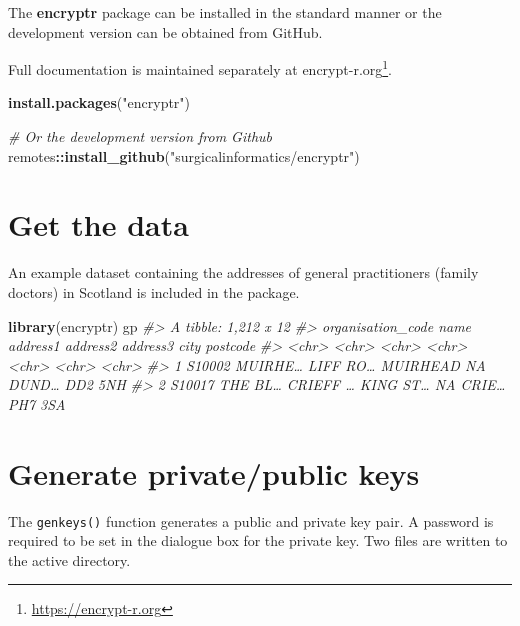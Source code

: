 \documentclass[
  12pt,
  krantz2]{krantz}
\makeatletter
\newenvironment{Shaded}{\begin{snugshade}}{\end{snugshade}}
\newcommand{\CommentTok}[1]{\textcolor[rgb]{0.56,0.35,0.01}{\textit{#1}}}
\newcommand{\KeywordTok}[1]{\textcolor[rgb]{0.13,0.29,0.53}{\textbf{#1}}}
\newcommand{\NormalTok}[1]{#1}
\newcommand{\OperatorTok}[1]{\textcolor[rgb]{0.81,0.36,0.00}{\textbf{#1}}}
\newcommand{\StringTok}[1]{\textcolor[rgb]{0.31,0.60,0.02}{#1}}
\renewcommand{\href}[2]{#2\footnote{\url{#1}}}
\newenvironment{kframe}{%
\medskip{}
\setlength{\fboxsep}{.8em}
 \def\at@end@of@kframe{}%
 \ifinner\ifhmode%
  \def\at@end@of@kframe{\end{minipage}}%
  \begin{minipage}{\columnwidth}%
 \fi\fi%
 \def\FrameCommand##1{\hskip\@totalleftmargin \hskip-\fboxsep
 \colorbox{shadecolor}{##1}\hskip-\fboxsep
     \hskip-\linewidth \hskip-\@totalleftmargin \hskip\columnwidth}%
 \MakeFramed {\advance\hsize-\width
   \@totalleftmargin\z@ \linewidth\hsize
   \@setminipage}}%
 {\par\unskip\endMakeFramed%
 \at@end@of@kframe}
\renewenvironment{Shaded}{\begin{kframe}}{\end{kframe}}
\makeatother
\begin{document}
The \textbf{encryptr} package can be installed in the standard manner or the development version can be obtained from GitHub.

Full documentation is maintained separately at \href{https://encrypt-r.org}{encrypt-r.org}.

\begin{Shaded}
\begin{Highlighting}[]
\KeywordTok{install.packages}\NormalTok{(}\StringTok{"encryptr"}\NormalTok{)}

\CommentTok{# Or the development version from Github}
\NormalTok{remotes}\OperatorTok{::}\KeywordTok{install_github}\NormalTok{(}\StringTok{"surgicalinformatics/encryptr"}\NormalTok{)}
\end{Highlighting}
\end{Shaded}

\hypertarget{get-the-data-6}{%
\section{Get the data}\label{get-the-data-6}}

An example dataset containing the addresses of general practitioners (family doctors) in Scotland is included in the package.

\begin{Shaded}
\begin{Highlighting}[]
\KeywordTok{library}\NormalTok{(encryptr)}
\NormalTok{gp}
\CommentTok{#> A tibble: 1,212 x 12}
\CommentTok{#>   organisation_code name    address1 address2 address3 city  postcode}
\CommentTok{#>   <chr>             <chr>   <chr>    <chr>    <chr>    <chr> <chr>}
\CommentTok{#> 1 S10002            MUIRHE… LIFF RO… MUIRHEAD NA       DUND… DD2 5NH}
\CommentTok{#> 2 S10017            THE BL… CRIEFF … KING ST… NA       CRIE… PH7 3SA}
\end{Highlighting}
\end{Shaded}

\hypertarget{generate-privatepublic-keys}{%
\section{Generate private/public keys}\label{generate-privatepublic-keys}}


The \texttt{genkeys()} function generates a public and private key pair.
A password is required to be set in the dialogue box for the private key.
Two files are written to the active directory.
\end{document}
